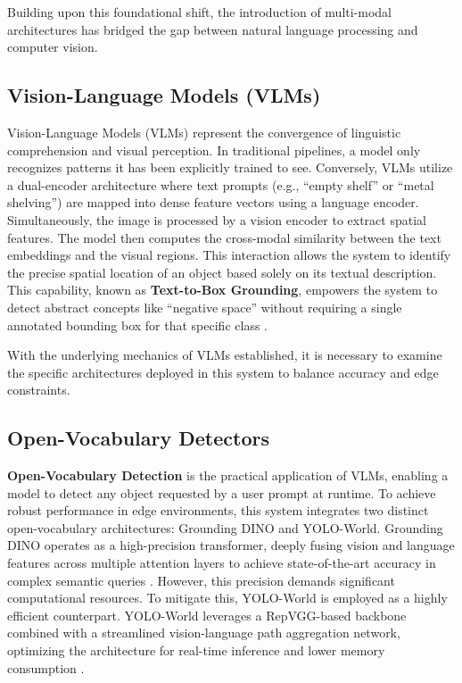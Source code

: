 Building upon this foundational shift, the introduction of multi-modal architectures has bridged the gap between natural language processing and computer vision.

\subsection{Vision-Language Models (VLMs)}
Vision-Language Models (VLMs) represent the convergence of linguistic comprehension and visual perception. In traditional pipelines, a model only recognizes patterns it has been explicitly trained to see. Conversely, VLMs utilize a dual-encoder architecture where text prompts (e.g., ``empty shelf'' or ``metal shelving'') are mapped into dense feature vectors using a language encoder. Simultaneously, the image is processed by a vision encoder to extract spatial features. The model then computes the cross-modal similarity between the text embeddings and the visual regions. This interaction allows the system to identify the precise spatial location of an object based solely on its textual description. This capability, known as \textbf{Text-to-Box Grounding}, empowers the system to detect abstract concepts like ``negative space'' without requiring a single annotated bounding box for that specific class \cite{ref:groundingdino}.

With the underlying mechanics of VLMs established, it is necessary to examine the specific architectures deployed in this system to balance accuracy and edge constraints.

\subsection{Open-Vocabulary Detectors}
\textbf{Open-Vocabulary Detection} is the practical application of VLMs, enabling a model to detect any object requested by a user prompt at runtime. To achieve robust performance in edge environments, this system integrates two distinct open-vocabulary architectures: Grounding DINO and YOLO-World. Grounding DINO operates as a high-precision transformer, deeply fusing vision and language features across multiple attention layers to achieve state-of-the-art accuracy in complex semantic queries \cite{ref:groundingdino}. However, this precision demands significant computational resources. To mitigate this, YOLO-World is employed as a highly efficient counterpart. YOLO-World leverages a RepVGG-based backbone combined with a streamlined vision-language path aggregation network, optimizing the architecture for real-time inference and lower memory consumption \cite{ref:yoloworld}.

